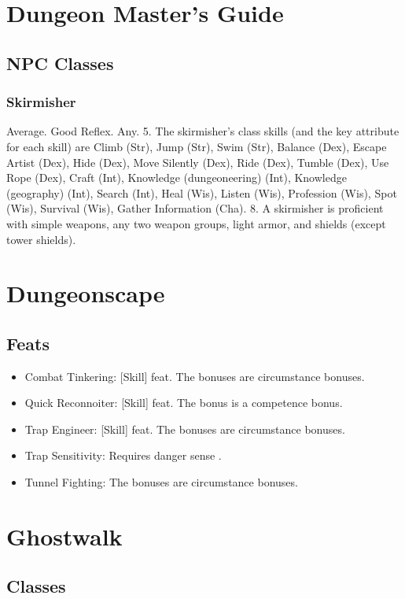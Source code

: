\section{Dungeon Master's Guide}
\subsection{NPC Classes}
\subsubsection{Skirmisher}
 Average.
 Good Reflex.
 Any.
 5.
 The skirmisher's class skills (and the key attribute for each skill) are Climb (Str), Jump (Str), Swim (Str), Balance (Dex), Escape Artist (Dex), Hide (Dex), Move Silently (Dex), Ride (Dex), Tumble (Dex), Use Rope (Dex), Craft (Int), Knowledge (dungeoneering) (Int), Knowledge (geography) (Int), Search (Int), Heal (Wis), Listen (Wis), Profession (Wis), Spot (Wis), Survival (Wis), Gather Information (Cha).
 8.
 A skirmisher is proficient with simple weapons, any two weapon groups, light armor, and shields (except tower shields).

\section{Dungeonscape}
\subsection{Feats}
\begin{itemize}
\item Combat Tinkering: [Skill] feat. The bonuses are circumstance bonuses.
\item Quick Reconnoiter: [Skill] feat. The bonus is a competence bonus.
\item Trap Engineer: [Skill] feat. The bonuses are circumstance bonuses.
\item Trap Sensitivity: Requires danger sense .
\item Tunnel Fighting: The bonuses are circumstance bonuses.
\end{itemize}

\section{Ghostwalk}
\subsection{Classes}
